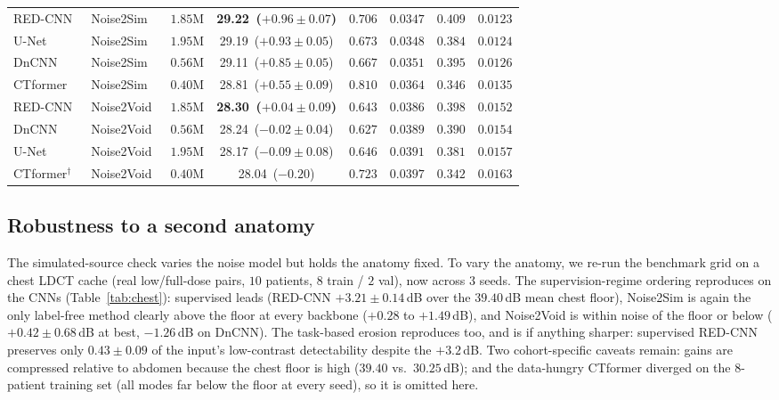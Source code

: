 \begin{table}[t]
\begin{tabular}{llrccccc}
    \midrule
    RED-CNN~\cite{chen2017lowdose}   & Noise2Sim~\cite{niu2020noise2sim} & $1.85\mathrm{M}$ & \textbf{29.22 \,($+0.96{\pm}0.07$)} & $0.706$ & $0.0347$ & $0.409$ & $0.0123$ \\
    U-Net                            & Noise2Sim~\cite{niu2020noise2sim} & $1.95\mathrm{M}$ & 29.19 \,($+0.93{\pm}0.05$) & $0.673$ & $0.0348$ & $0.384$ & $0.0124$ \\
    DnCNN~\cite{zhang2017beyond}     & Noise2Sim~\cite{niu2020noise2sim} & $0.56\mathrm{M}$ & 29.11 \,($+0.85{\pm}0.05$) & $0.667$ & $0.0351$ & $0.395$ & $0.0126$ \\
    CTformer~\cite{wang2022ctformer} & Noise2Sim~\cite{niu2020noise2sim} & $0.40\mathrm{M}$ & 28.81 \,($+0.55{\pm}0.09$) & $0.810$ & $0.0364$ & $0.346$ & $0.0135$ \\
    \midrule
    RED-CNN~\cite{chen2017lowdose}   & Noise2Void~\cite{krull2019noise2void} & $1.85\mathrm{M}$ & \textbf{28.30 \,($+0.04{\pm}0.09$)} & $0.643$ & $0.0386$ & $0.398$ & $0.0152$ \\
    DnCNN~\cite{zhang2017beyond}     & Noise2Void~\cite{krull2019noise2void} & $0.56\mathrm{M}$ & 28.24 \,($-0.02{\pm}0.04$) & $0.627$ & $0.0389$ & $0.390$ & $0.0154$ \\
    U-Net                            & Noise2Void~\cite{krull2019noise2void} & $1.95\mathrm{M}$ & 28.17 \,($-0.09{\pm}0.08$) & $0.646$ & $0.0391$ & $0.381$ & $0.0157$ \\
    CTformer$^{\dagger}$~\cite{wang2022ctformer} & Noise2Void~\cite{krull2019noise2void} & $0.40\mathrm{M}$ & 28.04 \,($-0.20$) & $0.723$ & $0.0397$ & $0.342$ & $0.0163$ \\
    \bottomrule
  \end{tabular}
\end{table}

\subsection{Robustness to a second anatomy}
\label{sec:chest}
The simulated-source check varies the noise model but holds the anatomy fixed.
To vary the anatomy, we re-run the benchmark grid on a chest LDCT cache
(real low/full-dose pairs, $10$ patients, $8$ train / $2$ val), now across $3$
seeds.  The supervision-regime ordering
reproduces on the CNNs (Table~\ref{tab:chest}): supervised leads (RED-CNN
$+3.21{\pm}0.14$\,dB over the $39.40$\,dB mean chest floor), Noise2Sim is again
the only label-free method clearly above the floor at every backbone
($+0.28$ to $+1.49$\,dB), and Noise2Void is within noise of the floor or below
($+0.42{\pm}0.68$\,dB at best, $-1.26$\,dB on DnCNN).  The task-based erosion
reproduces too, and is if anything sharper: supervised RED-CNN preserves only
$0.43{\pm}0.09$ of the input's low-contrast detectability despite the
$+3.2$\,dB.  Two cohort-specific caveats remain: gains are compressed relative to
abdomen because the chest floor is high ($39.40$ vs.\ $30.25$\,dB); and the
data-hungry CTformer diverged on the $8$-patient training set (all modes far
below the floor at every seed), so it is omitted here.

